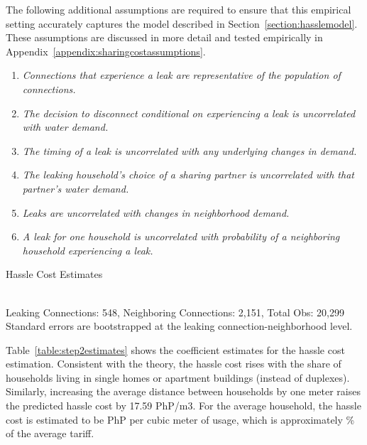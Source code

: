 \documentclass[12pt]{article}
\begin{document}
The following additional assumptions are required to ensure that this empirical setting accurately captures the model described in Section~\ref{section:hasslemodel}.  These assumptions are discussed in more detail and tested empirically in Appendix~\ref{appendix:sharingcostassumptions}.
\begin{enumerate}
	\item \textit{ Connections that experience a leak are representative of the population of connections. } 
	\item \textit{ The decision to disconnect conditional on experiencing a leak is uncorrelated with water demand. } 
	\item \textit{ The timing of a leak is uncorrelated with any underlying changes in demand. } 
	\item \textit{  The leaking household's choice of a sharing partner is uncorrelated with that partner's water demand.  }	
	\item \textit{ Leaks are uncorrelated with changes in neighborhood demand. }
	\item \textit{  A leak for one household is uncorrelated with probability of a neighboring household experiencing a leak. }
\end{enumerate}


\begin{table}
\centering
\caption{Hassle Cost Estimates}\label{table:step2estimates}
 \\
\vspace{.2cm} 
\footnotesize{Leaking Connections:  548,   Neighboring Connections:  2,151,   Total Obs:  20,299  \\ Standard errors are bootstrapped at the leaking connection-neighborhood level. }
\end{table}


Table~\ref{table:step2estimates} shows the coefficient estimates for the hassle cost estimation.  Consistent with the theory, the hassle cost rises with the share of households living in single homes or apartment buildings (instead of duplexes).  Similarly, increasing the average distance between households by one meter raises the predicted hassle cost by 17.59 PhP/m3.  For the average household, the hassle cost is estimated to be PhP per cubic meter of usage, which is approximately \unskip\% of the average tariff.  
\end{document}
